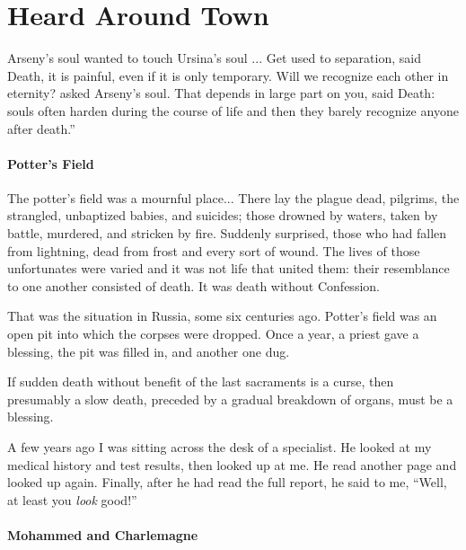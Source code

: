 \section{Heard Around Town}

\begin{quotex}
Arseny's soul wanted to touch Ursina's soul ... Get used to separation, said Death, it is painful, even if it is only temporary. Will we recognize each other in eternity? asked Arseny's soul. That depends in large part on you, said Death: souls often harden during the course of life and then they barely recognize anyone after death.''
\end{quotex}


\paragraph{Potter's Field}


\begin{quotex}
The potter's field was a mournful place... There lay the plague dead, pilgrims, the strangled, unbaptized babies, and suicides; those drowned by waters, taken by battle, murdered, and stricken by fire. Suddenly surprised, those who had fallen from lightning, dead from frost and every sort of wound. The lives of those unfortunates were varied and it was not life that united them: their resemblance to one another consisted of death. It was death without Confession.
\end{quotex}


That was the situation in Russia, some six centuries ago. Potter's field was an open pit into which the corpses were dropped. Once a year, a priest gave a blessing, the pit was filled in, and another one dug.

If sudden death without benefit of the last sacraments is a curse, then presumably a slow death, preceded by a gradual breakdown of organs, must be a blessing.

A few years ago I was sitting across the desk of a specialist. He looked at my medical history and test results, then looked up at me. He read another page and looked up again. Finally, after he had read the full report, he said to me, ``Well, at least you \emph{look} good!''

\paragraph{Mohammed and Charlemagne}


